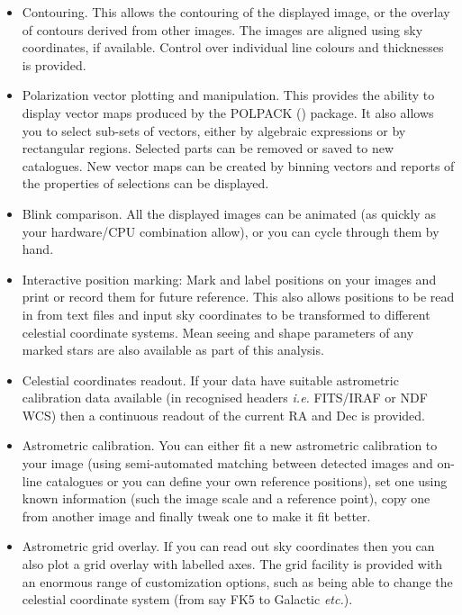 \documentclass[twoside,11pt,nolof]{starlink}
\begin{document}
\begin{itemize}
\item Contouring. This allows the contouring of the displayed image,
 or the overlay of contours derived from other images. The images are
 aligned using sky coordinates, if available. Control over individual
 line colours and thicknesses is provided.

\item Polarization vector plotting and manipulation. This provides the
 ability to display vector maps produced by the POLPACK
 () package. It also allows you to select
 sub-sets of vectors, either by algebraic expressions or by rectangular
 regions. Selected parts can be removed or saved to new catalogues. New
 vector maps can be created by binning vectors and reports of the
 properties of selections can be displayed.

\item Blink comparison. All the displayed images can be animated
  (as quickly as your hardware/CPU combination allow), or
  you can cycle through them by hand.

\item Interactive position marking: Mark and label positions on your
  images and print or record them for future reference. This also
  allows positions to be read in from text files and input sky
  coordinates to be transformed to different celestial coordinate
  systems. Mean seeing and shape parameters of any marked stars are
  also available as part of this analysis.

\item Celestial coordinates readout. If your data have suitable
  astrometric calibration data available (in recognised headers
  \textit{i.e.} FITS/IRAF or NDF WCS) then a continuous readout of the
  current RA and Dec is provided.

\item Astrometric calibration. You can either fit a new astrometric
  calibration to your image (using semi-automated matching between detected
  images and on-line catalogues or you can define your own reference
  positions), set one using known information (such the image scale and a
  reference point), copy one from another image and finally tweak one to make
  it fit better.

\item Astrometric grid overlay. If you can read out sky coordinates
  then you can also plot a grid overlay with labelled
  axes. The grid facility is provided with an enormous range of
  customization options, such as being able to change the
  celestial coordinate system (from say FK5 to  Galactic \emph{etc.}).


\end{itemize}
\end{document}

